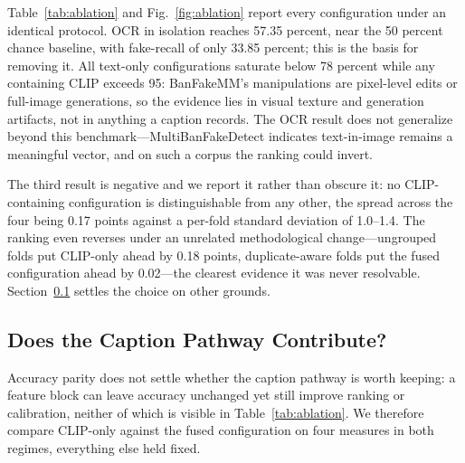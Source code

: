 \documentclass[conference,a4paper]{IEEEtran}
\begin{document}
Table~\ref{tab:ablation} and Fig.~\ref{fig:ablation} report every configuration
under an identical protocol. OCR in isolation reaches 57.35 percent, near the
50 percent chance baseline, with fake-recall of only 33.85 percent; this is the
basis for removing it. All text-only configurations saturate below 78 percent
while any containing CLIP exceeds 95: BanFakeMM's manipulations are pixel-level
edits or full-image generations, so the evidence lies in visual texture and
generation artifacts, not in anything a caption records. The OCR result does
not generalize beyond this benchmark---MultiBanFakeDetect \cite{multibanfake}
indicates text-in-image remains a meaningful vector, and on such a corpus the
ranking could invert.

The third result is negative and we report it rather than obscure it: no
CLIP-containing configuration is distinguishable from any other, the spread
across the four being 0.17 points against a per-fold standard deviation of
1.0--1.4. The ranking even reverses under an unrelated methodological
change---ungrouped folds put CLIP-only ahead by 0.18 points, duplicate-aware
folds put the fused configuration ahead by 0.02---the clearest evidence it was
never resolvable. Section~\ref{sec:fusion} settles the choice on other
grounds.

\subsection{Does the Caption Pathway Contribute?}
\label{sec:fusion}

Accuracy parity does not settle whether the caption pathway is worth keeping:
a feature block can leave accuracy unchanged yet still improve ranking or
calibration, neither of which is visible in Table~\ref{tab:ablation}. We
therefore compare CLIP-only against the fused configuration on four measures in
both regimes, everything else held fixed.
\end{document}
